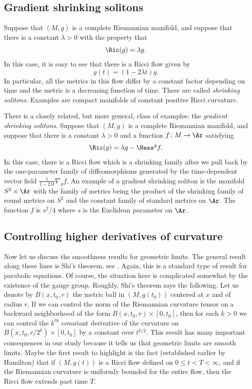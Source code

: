 \subsection{Gradient shrinking solitons}


Suppose that $(M,g)$ is a complete Riemannian manifold, and suppose
that there is a constant $\lambda>0$ with the property that
$$\Ric(g)=\lambda g.$$
In this case, it is easy to see that there is a Ricci flow given by
$$g(t)=(1-2\lambda t)g.$$ In particular, all the metrics in this flow
differ by a constant factor depending on time and the metric is a
decreasing function of time. These are called {\em shrinking
solitons}. Examples are compact
manifolds of constant positive Ricci curvature.

There is a closely related, but more general, class of examples: the
{\em gradient shrinking solitons}. Suppose that $(M,g)$ is
 a complete Riemannian manifold, and suppose that  there is a constant
$\lambda>0$ and a function $f\colon M\to \Ar$ satisfying
$$\Ric(g)=\lambda g-\Hess^{g}f.$$
 In this case, there is a Ricci flow which is a shrinking
 family after we pull back by the one-parameter family of diffeomorphisms generated by
 the time-dependent vector field $\frac{1}{1-2\lambda t}\nabla_{g} f$.
 An example of a gradient shrinking soliton is the manifold
 $S^2\times \Ar$ with the family of metrics being the product of the
 shrinking family of round metrics on $S^2$ and the constant
 family of standard metrics on $\Ar$. The function $f$ is $s^2/4$ where $s$ is the
 Euclidean parameter on $\Ar$.



\subsection{Controlling higher derivatives of curvature}

Now let us discuss the smoothness results for geometric limits. The
general result along these lines is Shi's theorem, see \cite{Shi1,Shi2}. Again, this is a standard type of
result for parabolic equations. Of course, the situation here is
complicated somewhat by the existence of the gauge group. Roughly,
Shi's theorem says the following. Let us denote by $B(x,t_0,r)$ the
metric ball in $(M,g(t_0))$ centered at $x$ and of radius $r$. If we
can control the norm of the Riemannian curvature tensor on a
backward neighborhood of the form $B(x,t_0,r)\times [0,t_0]$, then
for each $k>0$ we can control the $k^{th}$ covariant derivative of
the curvature on $B(x,t_0,r/2^k)\times [0,t_0]$ by a constant over
$t^{k/2}$. This result has many important consequences in our study
because it tells us that geometric limits are smooth limits. Maybe
the first result to highlight is the fact (established earlier by
Hamilton) that if $(M,g(t))$ is a Ricci flow defined on $0\le
t<T<\infty$, and if the Riemannian curvature is uniformly bounded
for the entire flow, then the Ricci flow extends past time $T$.



